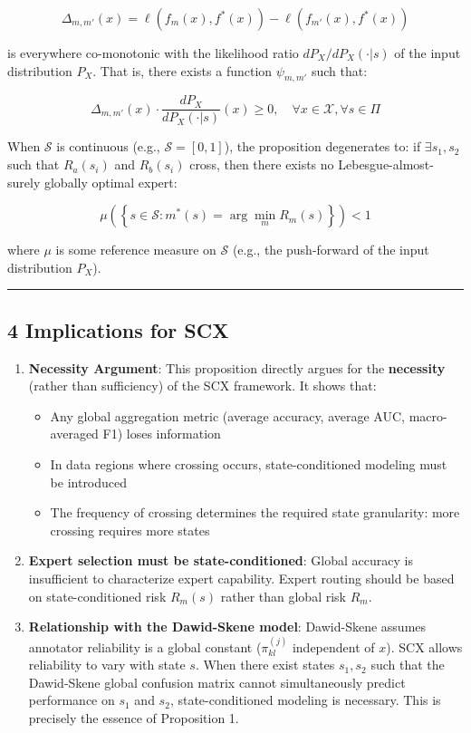 \documentclass[
  12pt,
]{ctexart}
\providecommand{\tightlist}{%
  \setlength{\itemsep}{0pt}\setlength{\parskip}{0pt}}
\begin{document}
\[\Delta_{m,m'}(x) = \ell(f_m(x), f^*(x)) - \ell(f_{m'}(x), f^*(x))\]

is everywhere co-monotonic with the likelihood ratio \(dP_X/dP_X(\cdot|s)\)
of the input distribution \(P_X\). That is, there exists a function \(\psi_{m,m'}\) such that:

\[\Delta_{m,m'}(x) \cdot \frac{dP_X}{dP_X(\cdot|s)}(x) \geq 0, \quad \forall x \in \mathcal{X}, \forall s \in \Pi\]

When \(\mathcal{S}\) is continuous (e.g., \(\mathcal{S} = [0,1]\)), the proposition degenerates to: if
\(\exists s_1, s_2\) such that \(R_a(s_i)\) and \(R_b(s_i)\) cross, then there exists no
Lebesgue-almost-surely globally optimal expert:

\[\mu\left(\left\{s \in \mathcal{S} : m^*(s) = \arg\min_m R_m(s)\right\}\right) < 1\]

where \(\mu\) is some reference measure on \(\mathcal{S}\) (e.g., the push-forward of the input distribution \(P_X\)).

\begin{center}\rule{0.5\linewidth}{0.5pt}\end{center}

\subsection{4 Implications for SCX}\label{implications-for-scx}

\begin{enumerate}
\def\labelenumi{\arabic{enumi}.}
\item
  \textbf{Necessity Argument}: This proposition directly argues for the \textbf{necessity} (rather than sufficiency) of the SCX framework. It shows that:

  \begin{itemize}
  \tightlist
  \item
    Any global aggregation metric (average accuracy, average AUC, macro-averaged F1) loses information
  \item
    In data regions where crossing occurs, state-conditioned modeling must be introduced
  \item
    The frequency of crossing determines the required state granularity: more crossing requires more states
  \end{itemize}
\item
  \textbf{Expert selection must be state-conditioned}: Global accuracy is insufficient to characterize expert capability. Expert routing should be based on state-conditioned risk \(R_m(s)\) rather than global risk \(R_m\).
\item
  \textbf{Relationship with the Dawid-Skene model}: Dawid-Skene assumes annotator reliability is a global constant (\(\pi^{(j)}_{kl}\) independent of \(x\)). SCX allows reliability to vary with state \(s\). When there exist states \(s_1, s_2\) such that the Dawid-Skene global confusion matrix cannot simultaneously predict performance on \(s_1\) and \(s_2\), state-conditioned modeling is necessary. This is precisely the essence of Proposition 1.
\end{enumerate}
\end{document}
